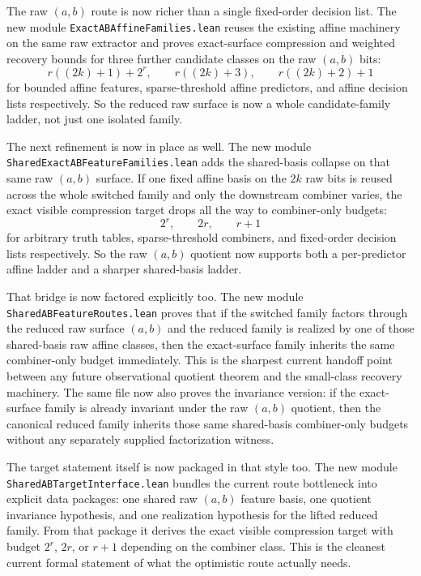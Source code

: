 \documentclass[11pt]{article}
\theoremstyle{remark}
\begin{document}
The raw \((a,b)\) route is now richer than a single fixed-order decision list.
The new module \texttt{ExactABAffineFamilies.lean} reuses the existing affine
machinery on the same raw extractor and proves exact-surface compression and
weighted recovery bounds for three further candidate classes on the raw
\((a,b)\) bits:
\[
  r((2k)+1)+2^r, \qquad r((2k)+3), \qquad r((2k)+2)+1
\]
for bounded affine features, sparse-threshold affine predictors, and affine
decision lists respectively.  So the reduced raw surface is now a whole
candidate-family ladder, not just one isolated family.

The next refinement is now in place as well.  The new module
\texttt{SharedExactABFeatureFamilies.lean} adds the shared-basis collapse on
that same raw \((a,b)\) surface.  If one fixed affine basis on the \(2k\) raw
bits is reused across the whole switched family and only the downstream
combiner varies, the exact visible compression target drops all the way to
combiner-only budgets:
\[
  2^r, \qquad 2r, \qquad r+1
\]
for arbitrary truth tables, sparse-threshold combiners, and fixed-order
decision lists respectively.  So the raw \((a,b)\) quotient now supports both a
per-predictor affine ladder and a sharper shared-basis ladder.

That bridge is now factored explicitly too.  The new module
\texttt{SharedABFeatureRoutes.lean} proves that if the switched family factors
through the reduced raw surface \((a,b)\) and the reduced family is realized by
one of those shared-basis raw affine classes, then the exact-surface family
inherits the same combiner-only budget immediately.  This is the sharpest
current handoff point between any future observational quotient theorem and the
small-class recovery machinery.  The same file now also proves the invariance
version: if the exact-surface family is already invariant under the raw
\((a,b)\) quotient, then the canonical reduced family inherits those same
shared-basis combiner-only budgets without any separately supplied
factorization witness.

The target statement itself is now packaged in that style too.  The new module
\texttt{SharedABTargetInterface.lean} bundles the current route bottleneck into
explicit data packages: one shared raw \((a,b)\) feature basis, one quotient
invariance hypothesis, and one realization hypothesis for the lifted reduced
family.  From that package it derives the exact visible compression target with
budget \(2^r\), \(2r\), or \(r+1\) depending on the combiner class.  This is
the cleanest current formal statement of what the optimistic route actually
needs.
\end{document}
